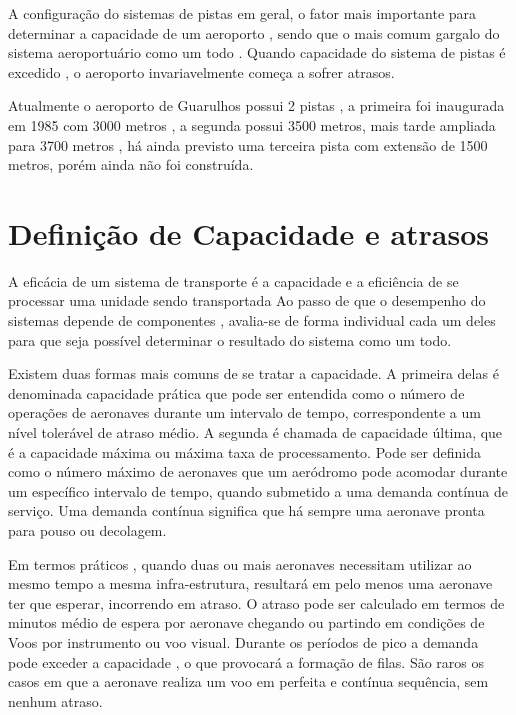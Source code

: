 \documentclass[12pt]{article}
\begin{document}
  A configuração do sistemas de pistas em geral, o fator mais importante
  para determinar a capacidade de um aeroporto , sendo que o mais comum 
  gargalo do sistema aeroportuário como um todo . Quando capacidade do 
  sistema de pistas é excedido , o aeroporto invariavelmente começa a 
  sofrer atrasos.
  
  
  
  Atualmente o aeroporto de Guarulhos possui 2 pistas , a primeira foi 
  inaugurada em 1985 com  3000 metros , a segunda possui 3500 metros, 
  mais tarde ampliada para 3700 metros , há ainda previsto uma terceira
  pista com extensão de 1500 metros, porém ainda não foi construída. 
  
  
  \section{Definição de Capacidade e atrasos}
  
  A eficácia de um sistema de transporte é a capacidade e a eficiência de
  se processar uma unidade sendo transportada Ao passo de que o desempenho
  do sistemas depende de componentes , avalia-se de forma individual cada
  um deles para que seja possível determinar o resultado do sistema como 
  um todo. 
  
  Existem duas formas mais comuns de se tratar a capacidade. A primeira delas
  é denominada capacidade prática que pode ser entendida como o número de 
  operações de aeronaves durante um intervalo de tempo, correspondente a um
  nível tolerável de atraso médio. A segunda é chamada de capacidade última,
  que é a capacidade máxima ou máxima taxa de processamento. Pode ser 
  definida como o número máximo de aeronaves que um aeródromo pode acomodar
  durante um específico intervalo de tempo, quando submetido a uma demanda
  contínua de serviço. Uma demanda contínua significa que há sempre uma 
  aeronave pronta para pouso ou decolagem. 
  
  Em termos práticos , quando duas ou mais aeronaves necessitam utilizar ao
  mesmo tempo a mesma infra-estrutura, resultará em pelo menos uma aeronave 
  ter que esperar, incorrendo em atraso. O atraso pode ser calculado em termos
  de minutos médio de espera por aeronave chegando ou partindo em condições 
  de Voos por instrumento ou voo visual. Durante os períodos de pico a demanda
  pode exceder a capacidade , o que provocará a formação de filas. São raros
  os casos em que a aeronave realiza um voo em perfeita e contínua sequência,
  sem nenhum atraso. 
  
\end{document}
